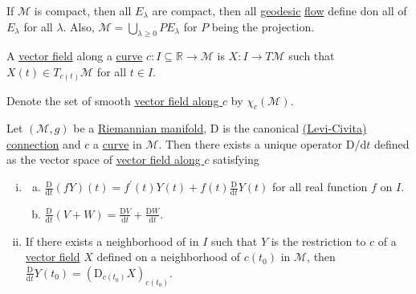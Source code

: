 \begin{remark}
	If \(\mathcal{M} \) is compact, then all \(E_\lambda \) are compact, then all \hyperref[def:geodesic]{geodesic} \hyperref[def:local-flow]{flow} define don all of \(E_\lambda \) for all \(\lambda \). Also, \(\mathcal{M} = \bigcup_{\lambda \geq 0} P E_\lambda \) for \(P\) being the projection.
\end{remark}

\begin{definition}\label{def:vector-field-along-a-curve}
	A \hyperref[def:vector-field]{vector field} along a \hyperref[def:curve]{curve} \(c\colon I \subseteq \mathbb{R} \to \mathcal{M} \) is \(X\colon I \to T \mathcal{M} \) such that \(X(t)\in T_{c(t)} \mathcal{M} \) for all \(t\in I\).
\end{definition}

\begin{notation}
	Denote the set of smooth \hyperref[def:vector-field-along-a-curve]{vector field along \(c\)}  by \(\chi _c(\mathcal{M} )\).
\end{notation}

\begin{theorem}\label{thm:lec11}
	Let \((\mathcal{M} , g)\) be a \hyperref[def:Riemannian-manifold]{Riemannian manifold}, \(\mathrm{D}\) is the canonical \hyperref[def:Levi-Civita-connection]{(Levi-Civita) connection} and \(c\) a \hyperref[def:curve]{curve} in \(\mathcal{M} \). Then there exists a unique operator \(\mathrm{D} / \mathrm{d} t\) defined as the vector space of \hyperref[def:vector-field-along-a-curve]{vector field along \(c\)} satisfying
	\begin{enumerate}[(i)]
		\item \label{thm:lec11-i}\begin{enumerate}[(a)]
			      \item \label{thm:lec11-i-a} \(\frac{\mathrm{D}}{\mathrm{d}t} (fY)(t) = f^\prime (t) Y(t) + f(t) \frac{\mathrm{D} }{\mathrm{d} t} Y(t)\) for all real function \(f\) on \(I\).
			      \item \label{thm:lec11-i-b} \(\frac{\mathrm{D} }{\mathrm{d} t} (V+W) = \frac{\mathrm{D} V}{\mathrm{d} t} + \frac{\mathrm{D} W}{\mathrm{d} t}\).
		      \end{enumerate}
		\item \label{thm:lec11-ii} If there exists a neighborhood of in \(I\) such that \(Y\) is the restriction to \(c\) of a \hyperref[def:vector-field]{vector field} \(X\) defined on a neighborhood of \(c(t_0)\) in \(\mathcal{M} \), then \(\frac{\mathrm{D} }{\mathrm{d} t} Y(t_0) = (\mathrm{D}_{c(t_0)} X) _{c(t_0)}\).
	\end{enumerate}
\end{theorem}

